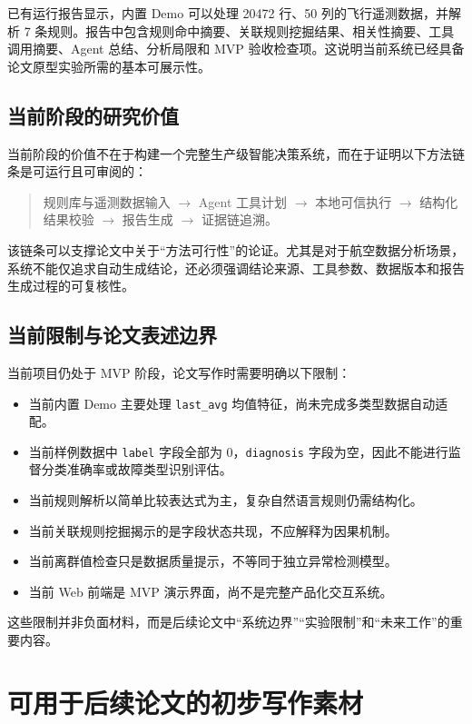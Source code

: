 \documentclass[UTF8,a4paper,zihao=-4]{ctexart}
\begin{document}
已有运行报告显示，内置 Demo 可以处理 20472 行、50 列的飞行遥测数据，并解析 7 条规则。报告中包含规则命中摘要、关联规则挖掘结果、相关性摘要、工具调用摘要、Agent 总结、分析局限和 MVP 验收检查项。这说明当前系统已经具备论文原型实验所需的基本可展示性。

\subsection{当前阶段的研究价值}

当前阶段的价值不在于构建一个完整生产级智能决策系统，而在于证明以下方法链条是可运行且可审阅的：
\begin{quote}
规则库与遥测数据输入 $\rightarrow$ Agent 工具计划 $\rightarrow$ 本地可信执行 $\rightarrow$ 结构化结果校验 $\rightarrow$ 报告生成 $\rightarrow$ 证据链追溯。
\end{quote}

该链条可以支撑论文中关于“方法可行性”的论证。尤其是对于航空数据分析场景，系统不能仅追求自动生成结论，还必须强调结论来源、工具参数、数据版本和报告生成过程的可复核性。

\subsection{当前限制与论文表述边界}

当前项目仍处于 MVP 阶段，论文写作时需要明确以下限制：
\begin{itemize}
  \item 当前内置 Demo 主要处理 \texttt{last\_avg} 均值特征，尚未完成多类型数据自动适配。
  \item 当前样例数据中 \texttt{label} 字段全部为 0，\texttt{diagnosis} 字段为空，因此不能进行监督分类准确率或故障类型识别评估。
  \item 当前规则解析以简单比较表达式为主，复杂自然语言规则仍需结构化。
  \item 当前关联规则挖掘揭示的是字段状态共现，不应解释为因果机制。
  \item 当前离群值检查只是数据质量提示，不等同于独立异常检测模型。
  \item 当前 Web 前端是 MVP 演示界面，尚不是完整产品化交互系统。
\end{itemize}

这些限制并非负面材料，而是后续论文中“系统边界”“实验限制”和“未来工作”的重要内容。

\section{可用于后续论文的初步写作素材}
\end{document}

